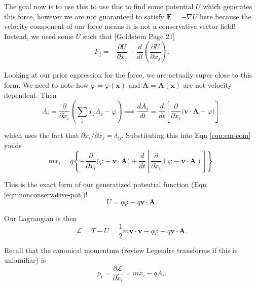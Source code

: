 \documentclass[12pt]{revtex4-2}
\begin{document}
The goal now is to use this to use this to find some potential $U$ which generates this force, however we are not guaranteed to satisfy $\mathbf{F} = -\nabla U$ here because the velocity component of our force means it is not a conservative vector field!  Instead, we need some $U$ such that [Goldstein Page 21]
\begin{equation}
    F_j = -\frac{\partial U}{\partial x_j} + \frac{d}{dt}\left( \frac{\partial U}{\partial \dot{x}_j} \right). \label{eqn:nonconservative-pot}
\end{equation}

Looking at our prior expression for the force, we are actually super close to this form.  We need to note how $\varphi = \varphi(\mathbf{x})$ and $\mathbf{A} = \mathbf{A}(\mathbf{x})$ are not velocity dependent.  Then
\begin{equation}
    A_i = \frac{\partial}{\partial \dot{x}_i}\left( \sum_j\dot{x}_j A_j - \varphi \right) \implies \frac{dA_i}{dt} = \frac{d}{dt}\left[ \frac{\partial}{\partial \dot{x}_i}\big( \mathbf{v}\cdot \mathbf{A} - \varphi \big) \right].
\end{equation}

which uses the fact that $\partial x_i/\partial x_j = \delta_{ij}$. Substituting this into Eqn \ref{eqn:em-eom} yields
\begin{equation}
    m\ddot{x_i} = q\left\{ -\frac{\partial}{\partial x_i}\big( \varphi - \mathbf{v}\cdot\mathbf{A} \big) + \frac{d}{dt}\left[ \frac{\partial}{\partial \dot{x}_i}\left( \varphi - \mathbf{v}\cdot\mathbf{A} \right) \right] \right\}.
\end{equation}

This is the exact form of our generatized potential function (Eqn. \ref{eqn:nonconservative-pot})!
\begin{equation}
    U = q\varphi - q\mathbf{v}\cdot\mathbf{A}.
\end{equation}

Our Lagrangian is then 
\begin{equation}
    \mathcal{L} = T - U = \frac{1}{2}m \mathbf{v}\cdot\mathbf{v} - q\varphi + q\mathbf{v}\cdot\mathbf{A}.
\end{equation}

Recall that the canonical momentum (review Legendre transforms if this is unfamiliar) is
\begin{equation}
    p_i = \frac{\partial \mathcal{L}}{\partial \dot{x}_i} = m\dot{x}_i - qA_i.
\end{equation}
\end{document}
